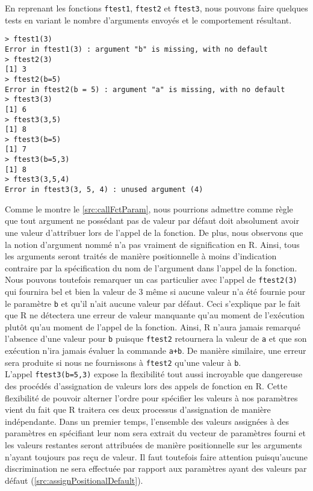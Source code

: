 En reprenant les fonctions \texttt{ftest1}, \texttt{ftest2} et \texttt{ftest3}, nous pouvons faire quelques tests en variant le nombre d'arguments envoyés et le comportement résultant.

\begin{lstlisting}[caption = Passage d'arguments à une fonction,label=src:callFctParam]
> ftest1(3)
Error in ftest1(3) : argument "b" is missing, with no default
> ftest2(3)
[1] 3
> ftest2(b=5)
Error in ftest2(b = 5) : argument "a" is missing, with no default
> ftest3(3)
[1] 6
> ftest3(3,5)
[1] 8
> ftest3(b=5)
[1] 7
> ftest3(b=5,3)
[1] 8
> ftest3(3,5,4)
Error in ftest3(3, 5, 4) : unused argument (4)
\end{lstlisting}

\vspace{\baselineskip}
Comme le montre le \autoref{src:callFctParam}, nous pourrions admettre comme règle que tout argument ne possédant pas de valeur par défaut doit absolument avoir une valeur d'attribuer lors de l'appel de la fonction. De plus, nous observons que la notion d'argument nommé n'a pas vraiment de signification en R. Ainsi, tous les arguments seront traités de manière positionnelle à moins d'indication contraire par la spécification du nom de l'argument dans l'appel de la fonction. Nous pouvons toutefois remarquer un cas particulier avec l'appel de \texttt{ftest2(3)} qui fournira bel et bien la valeur de 3 même si aucune valeur n'a été fournie pour le paramètre \texttt{b} et qu'il n'ait aucune valeur par défaut. Ceci s'explique par le fait que R ne détectera une erreur de valeur manquante qu'au moment de l'exécution plutôt qu'au moment de l'appel de la fonction. Ainsi, R n'aura jamais remarqué l'absence d'une valeur pour \texttt{b} puisque \texttt{ftest2} retournera la valeur de \texttt{a} et que son exécution n'ira jamais évaluer la commande \texttt{a+b}. De manière similaire, une erreur sera produite si nous ne fournissons à \texttt{ftest2} qu'une valeur à \texttt{b}. \\

L'appel \texttt{ftest3(b=5,3)} expose la flexibilité tout aussi incroyable que dangereuse des procédés d'assignation de valeurs lors des appels de fonction en R. Cette flexibilité de pouvoir alterner l'ordre pour spécifier les valeurs à nos paramètres vient du fait que R traitera ces deux processus d'assignation de manière indépendante. Dans un premier temps, l'ensemble des valeurs assignées à des paramètres en spécifiant leur nom sera extrait du vecteur de paramètres fourni et les valeurs restantes seront attribuées de manière positionnelle sur les arguments n'ayant toujours pas reçu de valeur. Il faut toutefois faire attention puisqu’aucune discrimination ne sera effectuée par rapport aux paramètres ayant des valeurs par défaut (\autoref{src:assignPositionalDefault}).

